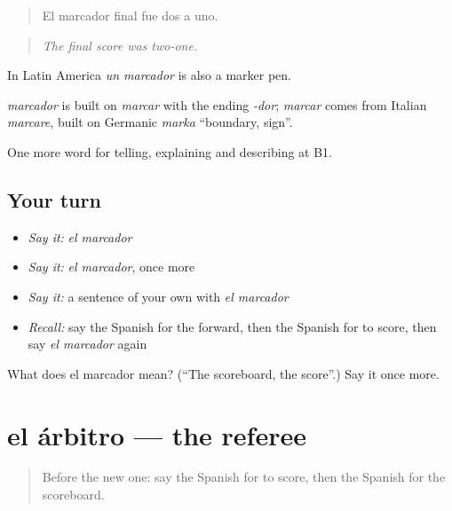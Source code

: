 \begin{quote}
El marcador final fue dos a uno.
\end{quote}

\begin{quote}
\emph{The final score was two-one.}
\end{quote}

In Latin America \emph{un marcador} is also a marker pen.

\begin{cousinweb}
\emph{marcador} is built on \emph{marcar} with the ending \emph{-dor}; \emph{marcar} comes from Italian \emph{marcare}, built on Germanic \emph{marka} \textquotedblleft{}boundary, sign\textquotedblright{}.
\end{cousinweb}

\begin{grammarlens}[title={What you've built}]
One more word for telling, explaining and describing at B1.
\end{grammarlens}

\subsection*{Your turn}
\begin{itemize}
\raggedright
  \item \emph{Say it:} \emph{el marcador}
  \item \emph{Say it:} \emph{el marcador}, once more
  \item \emph{Say it:} a sentence of your own with \emph{el marcador}
  \item \emph{Recall:} say the Spanish for the forward, then the Spanish for to score, then say \emph{el marcador} again
\end{itemize}

\begin{tcolorbox}[breakable,colback=teal!4,colframe=teal!35!black,title={Before you move on}]
What does el marcador mean? (\textquotedblleft{}The scoreboard, the score\textquotedblright{}.) Say it once more.
\end{tcolorbox}
\section[el árbitro]{el árbitro — the referee}

\label{lesson:ES-C756-arbitro}



\begin{quote}
Before the new one: say the Spanish for to score, then the Spanish for the scoreboard.
\end{quote}

